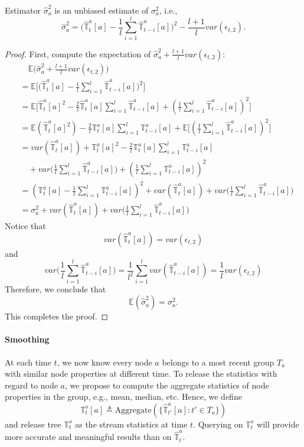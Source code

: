 \documentclass[acmsmall]{acmart}
\newcommand{\E}{\mathbb{E}}
\newcommand{\Tree}{\mathbb{T}}
\newcommand{\AT}{\Tree^a}
\newcommand{\hAT}{\hat{\Tree}^a}
\newcommand{\OT}{\Tree^o}
\newcommand{\var}{\mathit{var}}
\begin{document}
\begin{theorem}\label{thm:sigma}
  Estimator $\hat{\sigma}_a^2$ is an unbiased estimate of $\sigma_a^2$, i.e.,
  \[
    \hat{\sigma}_a^2
    = \big(\hAT_t[a] -\frac{1}{l}\sum_{i=1}^l\hAT_{t-i}[a]\big)^2
    -\frac{l+1}{l}\var(\epsilon_{t,2}).
  \]
\end{theorem}


\begin{proof}
First, compute the expectation of $\hat{\sigma}_a^2 + \frac{l+1}{l} \var(\epsilon_{t,2})$:
{\allowdisplaybreaks
\begin{align*}
  &\quad \E\big(\hat{\sigma}_a^2+\frac{l+1}{l}\var(\epsilon_{t,2})\big) \\
  &= \E\big[ \big(\hAT_t[a] -\frac{1}{l}\sum_{i=1}^l\hAT_{t-i}[a]\big)^2 \big] \\
  &= \E\big[ \hAT_t[a]^2 -\frac{2}{l}\hAT_t[a]\sum_{i=1}^l\hAT_{t-i}[a]
    +(\frac{1}{l}\sum_{i=1}^l\hAT_{t-i}[a])^2 \big] \\
  &= \E(\hAT_t[a]^2) -\frac{2}{l}\AT_t[a]\sum_{i=1}^l\AT_{t-i}[a]
    +\E\big[ (\frac{1}{l}\sum_{i=1}^l\hAT_{t-i}[a])^2 \big] \\
  &= \var(\hAT_t[a]) + \AT_t[a]^2 -\frac{2}{l}\AT_t[a]\sum_{i=1}^l\AT_{t-i}[a] \\
  &\quad +\var\big( \frac{1}{l}\sum_{i=1}^l\hAT_{t-i}[a] \big)
    +(\frac{1}{l}\sum_{i=1}^l\AT_{t-i}[a])^2 \\
  &= (\AT_t[a]-\frac{1}{l}\sum_{i=1}^l\AT_{t-i}[a])^2
    + \var(\hAT_t[a]) +\var\big( \frac{1}{l}\sum_{i=1}^l\hAT_{t-i}[a] \big) \\
  &= \sigma_a^2
    + \var(\hAT_t[a]) +\var\big( \frac{1}{l}\sum_{i=1}^l\hAT_{t-i}[a] \big)
\end{align*}
}
Notice that
\[
  \var(\hAT_t[a]) = \var(\epsilon_{t,2})
\]
and
\[
  \var\big( \frac{1}{l}\sum_{i=1}^l\hAT_{t-i}[a] \big)
  = \frac{1}{l^2}\sum_{i=1}^l\var(\hAT_{t-i}[a])
  = \frac{1}{l}\var(\epsilon_{t,2})
\]
Therefore, we conclude that
\[
  \E(\hat{\sigma}_a^2) = \sigma_a^2.
\]
This completes the proof.
\end{proof}

\paragraph{Smoothing}
At each time $t$, we now know every node $a$ belongs to a most recent group
$T_a$ with similar node properties at different time.
To release the statistics with regard to node $a$, we propose to compute the
aggregate statistics of node properties in the group, e.g., mean, median, etc.
Hence, we define
\[
  \OT_t[a] \triangleq \text{Aggregate}(\{\hAT_{t'}[a]\colon t'\in T_a\})
\]
and release tree $\OT_t$ as the stream statistics at time $t$.
Querying on $\OT_t$ will provide more accurate and meaningful results than on
$\hAT_t$.
\end{document}
